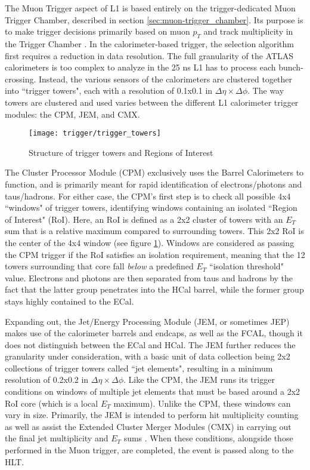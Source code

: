     The Muon Trigger aspect of L1 is based entirely on the trigger-dedicated Muon Trigger Chamber, described in section \ref{sec:muon-trigger_chamber}.
    Its purpose is to make trigger decisions primarily based on muon $p_T$ and track multiplicity in the Trigger Chamber \cite{trigger_run1}.
    In the calorimeter-based trigger, the selection algorithm first requires a reduction in data resolution.
    The full granularity of the ATLAS calorimeters is too complex to analyze in the 25 ns L1 has to process each bunch-crossing.
    Instead, the various sensors of the calorimeters are clustered together into ``trigger towers", each with a resolution of 0.1x0.1 in $\Delta \eta \times \Delta \phi$.
    The way towers are clustered and used varies between the different L1 calorimeter trigger modules: the CPM, JEM, and CMX.

    \begin{figure}[h]
        \texttt{[image: trigger/trigger\_towers]}
        \caption{Structure of trigger towers and Regions of Interest \cite{L1_calo_run1}}
        \label{fig:trigger_towers}
    \end{figure}


    The Cluster Processor Module (CPM) exclusively uses the Barrel Calorimeters to function, and is primarily meant for rapid identification of electrons/photons and taus/hadrons.
    For either case, the CPM's first step is to check all possible 4x4 ``windows" of trigger towers, identifying windows containing an isolated ``Region of Interest" (RoI).
    Here, an RoI is defined as a 2x2 cluster of towers with an $E_T$ sum that is a relative maximum compared to surrounding towers.
    This 2x2 RoI is the center of the 4x4 window (see figure \ref{fig:trigger_towers}).
    Windows are considered as passing the CPM trigger if the RoI satisfies an isolation requirement, meaning that the 12 towers surrounding that core fall \textit{below} a predefined $E_T$ ``isolation threshold" value.
    Electrons and photons are then separated from taus and hadrons by the fact that the latter group penetrates into the HCal barrel, while the former group stays highly contained to the ECal.

    Expanding out, the Jet/Energy Processing Module (JEM, or sometimes JEP) makes use of the calorimeter barrels and endcaps, as well as the FCAL, though it does not distinguish between the ECal and HCal.
    The JEM further reduces the granularity under consideration, with a basic unit of data collection being 2x2 collections of trigger towers called ``jet elements", resulting in a minimum resolution of 0.2x0.2 in $\Delta \eta \times \Delta \phi$.
    Like the CPM, the JEM runs its trigger conditions on windows of multiple jet elements that must be based around a 2x2 RoI core (which is a local $E_T$ maximum).
    Unlike the CPM, these windows can vary in size.
    Primarily, the JEM is intended to perform hit multiplicity counting as well as assist the Extended Cluster Merger Modules (CMX) in carrying out the final jet multiplicity and $E_T$ sums \cite{L1_calo_run1}\cite{trigger_run2}.
    When these conditions, alongside those performed in the Muon trigger, are completed, the event is passed along to the HLT.


